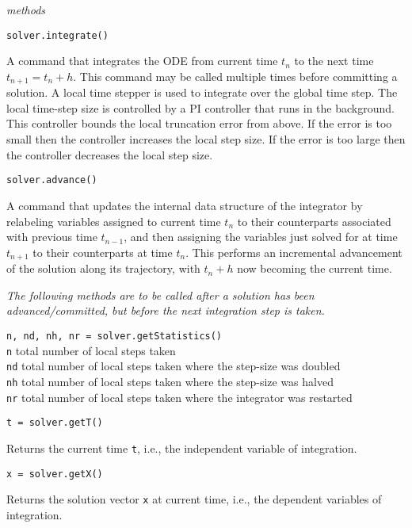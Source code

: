 \medskip\noindent
\textit{methods}

\medskip\noindent
\texttt{solver.integrate()}

\medskip\noindent
A command that integrates the ODE from current time $t_n$ to the next time $t_{n+1} = t_n + h$.  This command may be called multiple times before committing a solution.  A local time stepper is used to integrate over the global time step.  The local time-step size is controlled by a PI controller that runs in the background.  This controller bounds the local truncation error from above.  If the error is too small then the controller increases the local step size.  If the error is too large then the controller decreases the local step size.

\medskip\noindent
\texttt{solver.advance()}

\medskip\noindent
A command that updates the internal data structure of the integrator by relabeling variables assigned to current time $t_n$ to their counterparts associated with previous time $t_{n-1}$, and then assigning the variables just solved for at time $t_{n+1}$ to their counterparts at time $t_n$.  This performs an incremental advancement of the solution along its trajectory, with $t_n + h$ now becoming the current time.

\newpage
\medskip\noindent
\textit{The following methods are to be called after a solution has been advanced\slash committed, but before the next integration step is taken.}

\medskip\noindent
\texttt{n, nd, nh, nr = solver.getStatistics()} \\
\indent \texttt{n} \;\;\;\: total number of local steps taken \\
\indent \texttt{nd} \;\; total number of local steps taken where the step-size was doubled \\
\indent \texttt{nh} \;\; total number of local steps taken where the step-size was halved \\
\indent \texttt{nr} \;\; total number of local steps taken where the integrator was restarted 

\medskip\noindent
\texttt{t = solver.getT()}

\medskip\noindent
Returns the current time \texttt{t}, i.e., the independent variable of integration.

\medskip\noindent
\texttt{x = solver.getX()}

\medskip\noindent
Returns the solution vector \texttt{x} at current time, i.e., the dependent variables of integration.

